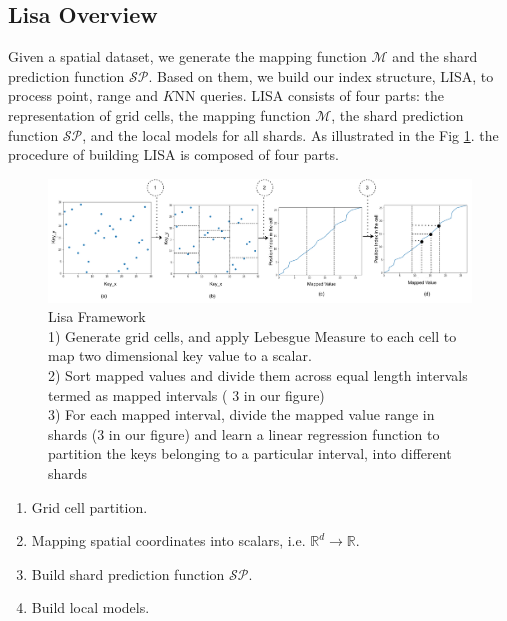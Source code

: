 \subsection{Lisa Overview}


Given a spatial dataset, we generate the mapping function $\mathcal{M}$ and the shard prediction function $\mathcal{SP}$. Based on them, we build our index structure, LISA, to process point, range and $K$NN queries. LISA consists of four parts: the representation of grid cells, the mapping function $\mathcal{M}$, the shard prediction function $\mathcal{SP}$, and the local models for all shards. As illustrated in the Fig \ref{fig:Lisa_Framework}. the procedure of building LISA is composed of four parts.

\begin{figure}[t]
    \centering
\includegraphics[width=1\textwidth]{graphs/implementation/lisa_overview.pdf}
    \caption{Lisa Framework\\
     1) Generate grid cells, and apply Lebesgue Measure to each cell to map two dimensional key value to a scalar.\\
    2) Sort mapped values and divide them across equal length intervals termed as mapped intervals ( 3 in our figure)\\
    3) For each mapped interval, divide the mapped value range in shards  (3 in our figure) and learn a linear regression function to partition the keys belonging to a particular interval, into different shards }
    \label{fig:Lisa_Framework}
\end{figure}

\begin{enumerate}
	\item Grid cell partition.
	\item Mapping spatial coordinates into scalars, i.e. $\mathbb{R}^d\to\mathbb{R}$.
	\item Build shard prediction function $\mathcal{SP}$.
	\item Build local models.
\end{enumerate}

